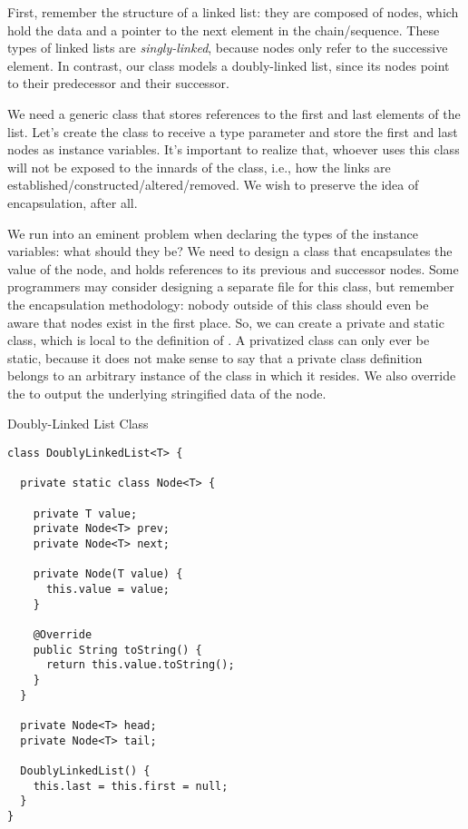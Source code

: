 
First, remember the structure of a linked list: they are composed of nodes, which hold the data and a pointer to the next element in the chain/sequence. These types of linked lists are \emph{singly-linked}, because nodes only refer to the successive element. In contrast, our class models a doubly-linked list, since its nodes point to their predecessor and their successor. 

We need a generic class that stores references to the first and last elements of the list. Let's create the  class to receive a type parameter  and store the first and last nodes as instance variables. It's important to realize that, whoever uses this class will not be exposed to the innards of the class, i.e., how the links are established/constructed/altered/removed. We wish to preserve the idea of encapsulation, after all.

We run into an eminent problem when declaring the types of the instance variables: what should they be? We need to design a class that encapsulates the value of the node, and holds references to its previous and successor nodes. Some programmers may consider designing a separate  file for this class, but remember the encapsulation methodology: nobody outside of this class should even be aware that nodes exist in the first place. So, we can create a private and static  class, which is local to the definition of . A privatized class can only ever be static, because it does not make sense to say that a private class definition belongs to an arbitrary instance of the class in which it resides. We also override the  to output the underlying stringified data of the node.

\begin{cl}[]{Doubly-Linked List Class}
\begin{lstlisting}[language=MyJava]
class DoublyLinkedList<T> {

  private static class Node<T> {

    private T value;
    private Node<T> prev;
    private Node<T> next;

    private Node(T value) { 
      this.value = value; 
    }

    @Override
    public String toString() {
      return this.value.toString();
    }
  }

  private Node<T> head;
  private Node<T> tail;

  DoublyLinkedList() {
    this.last = this.first = null;
  }
}
\end{lstlisting}
\end{cl}

